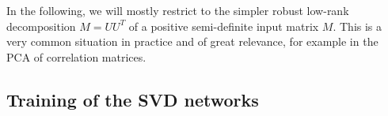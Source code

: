 In the following, we will mostly restrict to the simpler robust low-rank decomposition $M = UU^T$ of a positive semi-definite input matrix $M$. This is a very common situation in practice and of great relevance, for example in the PCA of correlation matrices.

\subsection{Training of the SVD networks}
